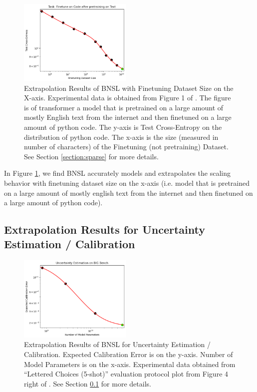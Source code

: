 \documentclass{article} %
\begin{document}
\begin{figure}[htbp]
    \centering
\includegraphics[width=0.48\textwidth]{figures/finetuning/language_code_finetuning.png}
    \caption{
Extrapolation Results of BNSL with Finetuning Dataset Size on the X-axis. Experimental data is obtained from Figure 1 of \cite{2021arXiv210201293H}. The figure is of transformer a model that is pretrained on a large amount of mostly English text from the internet and then finetuned on a large amount of python code. The y-axis is Test Cross-Entropy on the distribution of python code. The x-axis is the size (measured in number of characters) of the Finetuning (not pretraining) Dataset. See Section \ref{section:sparse} for more details.
    }
    \label{fig:finetuning}
\end{figure}

In Figure \ref{fig:finetuning}, we find BNSL accurately models and extrapolates the scaling behavior with finetuning dataset size on the x-axis (i.e. model that is pretrained on a large amount of mostly english text from the internet and then finetuned on a large amount of python code).

\subsection{Extrapolation Results for Uncertainty Estimation / Calibration}
\label{section:uncertainty}

\begin{figure}[htbp]
    \centering
\includegraphics[width=0.48\textwidth]{figures/uncertainty/uncertainty.png}
    \caption{
Extrapolation Results of BNSL for Uncertainty Estimation / Calibration. Expected Calibration Error is on the y-axis. Number of Model Parameters is on the x-axis. Experimental data obtained from ``Lettered Choices (5-shot)'' evaluation protocol plot from Figure 4 right of \cite{kadavath2022language}. See Section \ref{section:uncertainty} for more details.
    }
    \label{fig:uncertainty}
\end{figure}
\end{document}
